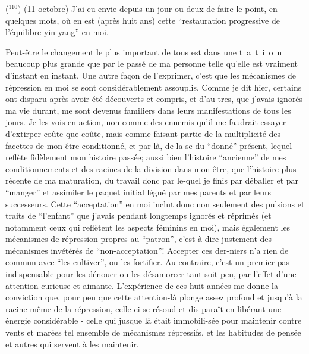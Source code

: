 (${}^{110}$) (11 octobre) J'ai eu envie depuis un jour ou deux de faire le point, en quelques mots, où en est (après huit ans) cette ``restauration progressive de l'équilibre yin-yang'' en moi.

Peut-être le changement le plus important de tous est dans une \mbox{}\linebreak\mbox{t a t i o n} beaucoup plus grande que par le passé de ma personne telle qu'elle est vraiment d'instant en instant. Une autre façon de l'exprimer, c'est que les mécanismes de répression en moi se sont considérablement assouplis. Comme je  dit hier, certains ont disparu après avoir été découverts et compris, et d'au-\linebreak tres, que j'avais ignorés ma vie durant, me sont devenus familiers dans leurs manifestations de tous les jours. Je les vois en action, non comme des ennemis qu'il me faudrait essayer d'extirper coûte que coûte, mais comme faisant partie de la multiplicité des facettes de mon être conditionné, et par là, de la \linebreak se du ``donné'' présent, lequel reflète fidèlement mon histoire passée; aussi bien l'histoire ``ancienne'' de mes conditionnements et des racines de la division dans mon être, que l'histoire plus récente de ma maturation, du travail donc par le-\linebreak quel je finis par déballer et par ``manger'' et assimiler le paquet initial légué par mes parents et par leurs successeurs. Cette ``acceptation'' en moi inclut donc\unsure{:} non seulement des pulsions et traits de ``l'enfant'' que j'avais pendant longtemps ignorés et réprimés (et notamment ceux qui reflètent les aspects féminins en moi), mais également les mécanismes de répression propres au ``patron'', c'est-à-dire justement des mécanismes invétérés de ``non-acceptation''! Accepter ces der-\linebreak niers n'a rien de commun avec ``les cultiver'', ou les fortifier. Au contraire, c'est un premier pas indispensable pour les dénouer ou les désamorcer tant soit peu, par l'effet d'une attention curieuse et aimante. L'expérience de ces huit années me donne la conviction que, pour peu que cette attention-là plonge assez profond et jusqu'à la racine même de la répression, celle-ci se résoud et dis-\linebreak paraît en libérant une énergie considérable - celle qui jusque là était immobili-\linebreak sée pour maintenir contre vents et marées tel ensemble de mécanismes répressifs, et les habitudes de pensée et autres qui servent à les maintenir.

